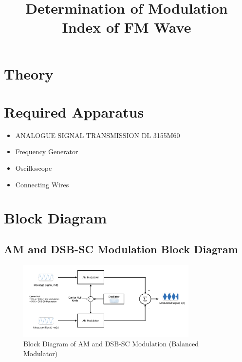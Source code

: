 \documentclass[12pt]{article}
\title{Determination of Modulation Index of FM Wave}
\author{}
\date{}
\begin{document}


\pagebreak

\tableofcontents

\pagebreak
{}
\maketitle

\section*{Theory}

\section*{Required Apparatus}
\begin{itemize}
    \item ANALOGUE SIGNAL TRANSMISSION DL 3155M60
    \item Frequency Generator
    \item Oscilloscope
    \item Connecting Wires
\end{itemize}

\section*{Block Diagram}
\subsection*{AM and DSB-SC Modulation Block Diagram}
\begin{figure}[H]
    \centering
    \includegraphics[width=0.8\textwidth]{bm.png}
    \caption{Block Diagram of AM and DSB-SC Modulation (Balanced Modulator)}
    \label{fig:modulation_block_diagram}
\end{figure}
\end{document}
